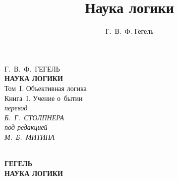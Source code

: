 \documentclass[a5paper, 10pt, twoside, onecolumn, openany]{memoir}
\author{Г.~В.~Ф. Гегель}
\title{Наука логики}
\date{}
\begin{document}
\frontmatter
\thispagestyle{plainfullpagecover}

{\centering\color{white}
  {\Large Г.~В.~Ф.~ГЕГЕЛЬ} \\
  \vspace{130pt}
  \textbf{\Huge НАУКА ЛОГИКИ} \\
  \vspace{60pt}
  {\Large Том~I. Объективная логика} \\
  \vspace{8pt}
  {\large Книга~I. Учение о~бытии} \\
  \vspace{70pt}
  \textit{перевод} \\
  \textit{Б.~Г.~СТОЛПНЕРА} \\
  \vspace{10pt}
  \textit{под редакцией} \\
  \textit{М.~Б.~МИТИНА}
\par}

\let\leftmarkold\leftmark
\renewcommand\leftmark{\memUChead{Г.В.Ф. Гегель. Наука логики. Том I. Книга 1}}

\cleardoublepage

\pagestyle{simple}
\setcounter{page}{1}
\renewcommand{\parttitlefont}{\Huge\color{white}}


\cleardoublepage

\mainmatter
\thispagestyle{plainfullpagecover}
{\centering\color{white}
  \ \\
  \vspace{50mm}
  {\huge\bfseries ГЕГЕЛЬ} \\
  \vspace{50mm}
  {\Huge\bfseries НАУКА ЛОГИКИ}
\par}

\end{document}
